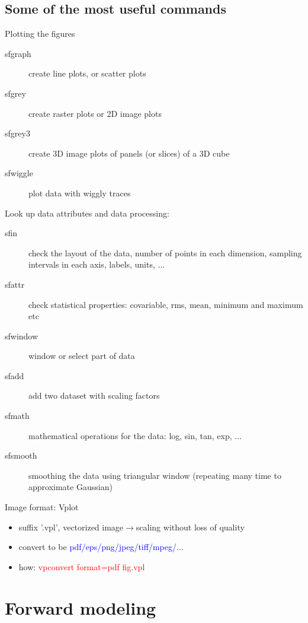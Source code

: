 \subsection{Some of the most useful commands}

  Plotting the figures
    \begin{description}
      \item[sfgraph]	create line plots, or scatter plots
      \item[sfgrey] 	create raster plots or 2D image plots
      \item[sfgrey3] 	create 3D image plots of panels (or slices) of a 3D cube
      \item[sfwiggle] 	plot data with wiggly traces 
    \end{description}
    
  Look up data attributes and data processing:
  \begin{description}
   \item[sfin] check the layout of the data, number of points in each dimension, sampling intervals in each axis, labels, units, ...
   \item[sfattr] check statistical properties: covariable, rms, mean, minimum and maximum etc
   \item[sfwindow] window or select part of data
   \item[sfadd] add two dataset with scaling factors
   \item[sfmath] mathematical operations for the data: log, sin, tan, exp, ...
   \item[sfsmooth] smoothing the data using triangular window (repeating many time to approximate Gaussian)
  \end{description}

  
  

  Image format: Vplot
  \begin{itemize}
  \item suffix '.vpl', vectorized image$\rightarrow$scaling without loss of quality
  \item convert to be \textcolor{blue}{pdf/eps/png/jpeg/tiff/mpeg/...}
  \item how: \textcolor{red}{vpconvert format=pdf fig.vpl}
  \end{itemize}
  



\section{Forward modeling}

